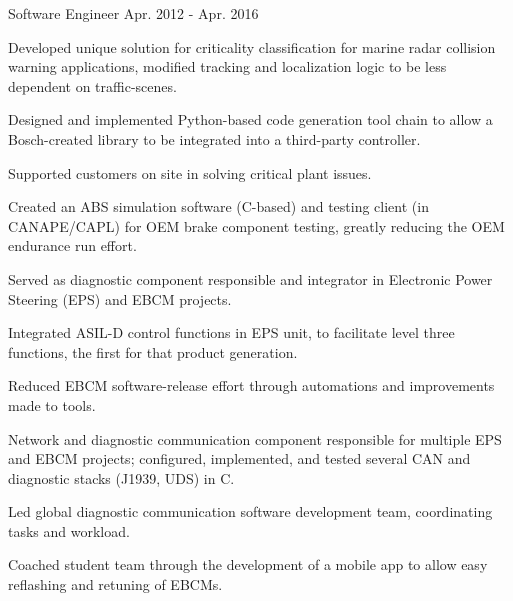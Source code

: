 \begin{cventries}
  \cventry
    {Software Engineer} %
    {} %
    {} %
    {Apr. 2012 - Apr. 2016} %
    {
      \begin{cvitems} %
        \item {Developed unique solution for criticality classification for marine radar collision warning applications, modified tracking and localization logic to be less dependent on traffic-scenes.}
        \item {Designed and implemented Python-based code generation tool chain to allow a Bosch-created library to be integrated into a third-party controller.}
        \item {Supported customers on site in solving critical plant issues.}
        \item {Created an ABS simulation software (C-based) and testing client (in CANAPE/CAPL) for OEM brake component testing, greatly reducing the OEM endurance run effort.}
        \item {Served as diagnostic component responsible and integrator in Electronic Power Steering (EPS) and EBCM projects.}
        \item {Integrated ASIL-D control functions in EPS unit, to facilitate level three functions, the first for that product generation.}
        \item {Reduced EBCM software-release effort through automations and improvements made to tools.}
        \item {Network and diagnostic communication component responsible for multiple EPS and EBCM projects; configured, implemented, and tested several CAN and diagnostic stacks (J1939, UDS) in C.}
        \item {Led global diagnostic communication software development team, coordinating tasks and workload.}
        \item {Coached student team through the development of a mobile app to allow easy reflashing and retuning of EBCMs.}
      \end{cvitems}
    }
\end{cventries}
